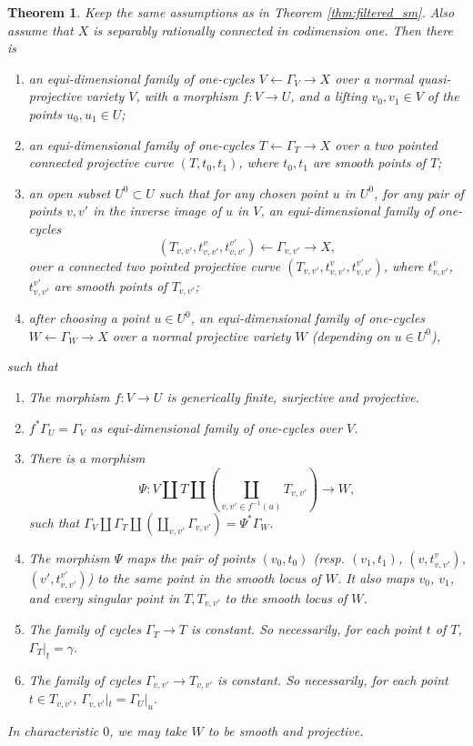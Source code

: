 \documentclass{amsart}
\newtheorem{thm}[theorem]{Theorem}
\theoremstyle{definition}
\theoremstyle{remark}
\begin{document}
\begin{thm}\label{thm:filtered}
Keep the same assumptions as in Theorem \ref{thm:filtered_sm}. 
Also assume that $X$ is separably rationally connected in codimension one.
Then there is
\begin{enumerate}
    \item an equi-dimensional family of one-cycles $V\leftarrow \Gamma_V \to X$ over a normal quasi-projective variety  $V$,  with a morphism $f: V \to U$, and a lifting $v_0, v_1 \in V$ of the points $u_0, u_1 \in U$;
    \item an equi-dimensional family of one-cycles $T \leftarrow \Gamma_T \to X$ over a two pointed connected projective curve $(T, t_0, t_1)$, where $t_0, t_1$ are smooth points of $T$;
    \item\label{cond:3sm} an open subset $U^0\subset U$ such that for any chosen point $u$ in $U^0$, for any pair of points $v, v'$ in the inverse image of $u$ in $V$, an equi-dimensional family of one-cycles $$(T_{v, v'}, t_{v, v'}^v, t_{v, v'}^{v'})\leftarrow \Gamma_{v, v'} \to X, $$ over a connected two pointed projective curve $(T_{v, v'}, t_{v, v'}^v, t_{v, v'}^{v'})$, where $t_{v, v'}^v$, $t_{v, v'}^{v'}$ are smooth points of $T_{v, v'}$;
    \item after choosing a point $u \in U^0$, an equi-dimensional family of one-cycles $W\leftarrow \Gamma_W \to X$ over a normal projective variety $W$ (depending on $u \in U^0$),
\end{enumerate} 
such that 
\begin{enumerate}
    \item[(i)] The morphism $f: V \to U$ is generically finite, surjective and projective.
    
    \item[(ii)]  $f^*\Gamma_U=\Gamma_V$ as equi-dimensional family of one-cycles over $V$.
    
    \item[(iii)] There is a morphism
    \[
    \Psi: V\coprod T\coprod (\coprod_{v, v' \in f^{-1}(u)}T_{v, v'})\to W,
    \]
    such that $\Gamma_V \coprod \Gamma_T \coprod (\coprod_{v, v'}\Gamma_{v, v'})=\Psi^*\Gamma_W$.
    
    \item[(iv)] The morphism $\Psi$ maps the pair of points $(v_0, t_0)$ (resp. $(v_1, t_1)$, $(v, t_{v, v'}^v)$, $(v', t_{v, v'}^{v'})$) to the same point in the smooth locus of $W$. It also maps $v_0$, $v_1$, and every singular point in $T, T_{v, v'}$ to the smooth locus of $W$. 
    
    \item[(v)]  The family of cycles $\Gamma_T\to T$ is constant. So necessarily, for each point $t$ of $T$,  $\Gamma_T|_{t}=\gamma$.


\item[(vi)] The family of cycles $\Gamma_{v, v'}\to T_{v, v'}$ is constant. So necessarily, for each point $t \in T_{v, v'}$, $\Gamma_{v, v'}|_t=\Gamma_U|_u$.
\end{enumerate}
In characteristic $0$, we may take $W$ to be smooth and projective.
\end{thm}
\end{document}
